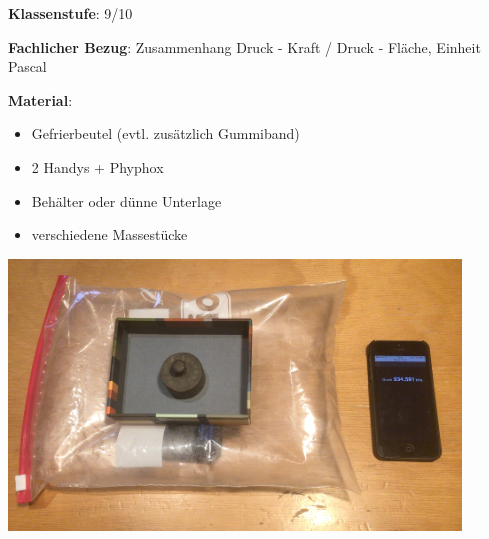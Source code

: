 \documentclass[../main.tex]{subfiles}
\begin{document}
\begin{tcolorbox}[
    width=\textwidth,
    height=\textheight,
    title=Phyphox: Kraft und Druck,
    fonttitle=\Large,
    before title=\vspace{0.2cm}, after title=\vspace{0.2cm},
    colback=white,
    title filled=true, 
    colbacktitle=myorange,
    colframe=black,
    coltitle=black,
    ]

    \vspace{0.2cm}
    \textbf{Klassenstufe}: 9/10

    \vspace{0.4cm}

    \textbf{Fachlicher Bezug}: Zusammenhang Druck - Kraft / Druck - Fläche, Einheit Pascal

    \vspace{0.2cm}
    \begin{minipage}[]{0.5\textwidth}


        \textbf{Material}: 
        \begin{itemize}[noitemsep]
            \item Gefrierbeutel (evtl. zusätzlich Gummiband)
            \item 2 Handys + Phyphox 
            \item Behälter oder dünne Unterlage 
            \item verschiedene Massestücke 
        \end{itemize}


    \end{minipage}
    \hspace{1.2cm}
    \begin{minipage}[]{0.45\textwidth}
        \vspace{0.2cm}
        \includegraphics[width=0.9\textwidth]{img/versuchsaufbau}
    \end{minipage}


\end{tcolorbox}
\end{document}
